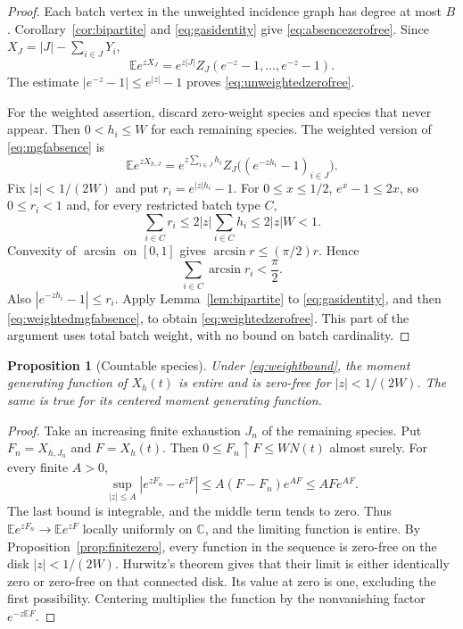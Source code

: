 \documentclass[11pt]{article}
\numberwithin{equation}{section}
\newtheorem{proposition}[theorem]{Proposition}
\theoremstyle{remark}
\newcommand{\E}{\mathbb E}
\newcommand{\C}{\mathbb C}
\begin{document}
\begin{proof}
Each batch vertex in the unweighted incidence graph has degree at most $B$.
Corollary~\ref{cor:bipartite} and \eqref{eq:gasidentity} give
\eqref{eq:absencezerofree}. Since $X_J=|J|-\sum_{i\in J}Y_i$,
\begin{equation}\label{eq:mgfabsence}
 \E e^{zX_J}=e^{z|J|}Z_J(e^{-z}-1,\ldots,e^{-z}-1).
\end{equation}
The estimate $|e^{-z}-1|\le e^{|z|}-1$ proves
\eqref{eq:unweightedzerofree}.

For the weighted assertion, discard zero-weight species and species that
never appear. Then $0<h_i\le W$ for each remaining species. The weighted
version of \eqref{eq:mgfabsence} is
\begin{equation}\label{eq:weightedmgfabsence}
 \E e^{zX_{h,J}}
 =e^{z\sum_{i\in J}h_i}
       Z_J\bigl((e^{-zh_i}-1)_{i\in J}\bigr).
\end{equation}
Fix $|z|<1/(2W)$ and put $r_i=e^{|z|h_i}-1$. For $0\le x\le1/2$,
$e^x-1\le2x$, so $0\le r_i<1$ and, for every restricted batch type $C$,
\[
 \sum_{i\in C}r_i\le2|z|\sum_{i\in C}h_i\le2|z|W<1.
\]
Convexity of $\arcsin$ on $[0,1]$ gives
$\arcsin r\le(\pi/2)r$. Hence
\[
 \sum_{i\in C}\arcsin r_i<\frac\pi2.
\]
Also $|e^{-zh_i}-1|\le r_i$. Apply Lemma~\ref{lem:bipartite} to
\eqref{eq:gasidentity}, and then \eqref{eq:weightedmgfabsence}, to obtain
\eqref{eq:weightedzerofree}. This part of the argument uses total batch
weight, with no bound on batch cardinality.
\end{proof}

\begin{proposition}[Countable species]\label{prop:countable}
Under \eqref{eq:weightbound}, the moment generating function of $X_h(t)$ is
entire and is zero-free for $|z|<1/(2W)$. The same is true for its centered
moment generating function.
\end{proposition}
\begin{proof}
Take an increasing finite exhaustion $J_n$ of the remaining species. Put
$F_n=X_{h,J_n}$ and $F=X_h(t)$. Then $0\le F_n\uparrow F\le WN(t)$ almost
surely. For every finite $A>0$,
\[
 \sup_{|z|\le A}|e^{zF_n}-e^{zF}|
 \le A(F-F_n)e^{AF}\le AF e^{AF}.
\]
The last bound is integrable, and the middle term tends to zero. Thus
$\E e^{zF_n}\to\E e^{zF}$ locally uniformly on $\C$, and the limiting
function is entire. By Proposition~\ref{prop:finitezero}, every function in
the sequence is zero-free on the disk $|z|<1/(2W)$. Hurwitz's theorem gives
that their limit is either identically zero or zero-free on that connected
disk. Its value at zero is one, excluding the first possibility. Centering
multiplies the function by the nonvanishing factor $e^{-z\E F}$.
\end{proof}
\end{document}
